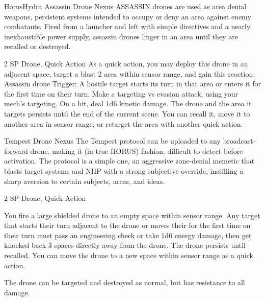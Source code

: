 \begin{mech}{Horus}{Hydra}
Assassin Drone Nexus
ASSASSIN drones are used as area denial weapons, persistent systems intended to occupy or deny an area against enemy combatants. Fired from a launcher and left with simple directives and a nearly inexhaustible power supply, assassin drones linger in an area until they are recalled or destroyed.  

2 SP
Drone, Quick Action
As a quick action, you may deploy this drone in an adjacent space, target a blast 2 area within sensor range, and gain this reaction:
Assassin drone
Trigger: A hostile target starts its turn in that area or enters it for the first time on their turn. Make a targeting vs evasion attack, using your mech’s targeting. On a hit, deal 1d6 kinetic damage.
The drone and the area it targets persists until the end of the current scene. You can recall it, move it to another area in sensor range, or retarget the area with another quick action.

Tempest Drone Nexus
The Tempest protocol can be uploaded to any broadcast-forward drone, making it (in true HORUS) fashion, difficult to detect before activation. The protocol is a simple one, an aggressive zone-denial memetic that blasts target systems and NHP with a strong subjective override, instilling a sharp aversion to certain subjects, areas, and ideas.   

2 SP
Drone, Quick Action

You fire a large shielded drone to an empty space within sensor range. Any target that starts their turn adjacent to the drone or moves their for the first time on their turn must pass an engineering check or take 1d6 energy damage, then get knocked back 3 spaces directly away from the drone. The drone persists until recalled. You can move the drone to a new space within sensor range as a quick action. 

The drone can be targeted and destroyed as normal, but has resistance to all damage.


\end{mech}

